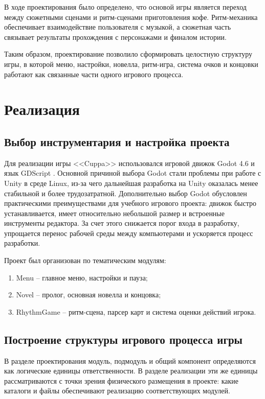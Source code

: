 \documentclass[utf8, russian]{eskdtext}
\numberwithin{equation}{section}
\let\stdsection\section
\renewcommand \section{\newpage\stdsection}
\begin{document}
В ходе проектирования было определено, что основой игры является переход между сюжетными сценами и ритм-сценами приготовления кофе. Ритм-механика обеспечивает взаимодействие пользователя с музыкой, а сюжетная часть связывает результаты прохождения с персонажами и финалом истории.

Таким образом, проектирование позволило сформировать целостную структуру игры, в которой меню, настройки, новелла, ритм-игра, система очков и концовки работают как связанные части одного игрового процесса.

\section{Реализация}

\subsection{Выбор инструментария и настройка проекта}

Для реализации игры <<Cuppa>> использовался игровой движок Godot 4.6 и язык GDScript \cite{godotdocs}. Основной причиной выбора Godot стали проблемы при работе с Unity в среде Linux, из-за чего дальнейшая разработка на Unity оказалась менее стабильной и более трудозатратной. Дополнительно выбор Godot обусловлен практическими преимуществами для учебного игрового проекта: движок быстро устанавливается, имеет относительно небольшой размер и встроенные инструменты редактора. За счет этого снижается порог входа в разработку, упрощается перенос рабочей среды между компьютерами и ускоряется процесс разработки.

Проект был организован по тематическим модулям:
\begin{enumerate}
    \item Menu -- главное меню, настройки и пауза;
    \item Novel -- пролог, основная новелла и концовка;
    \item RhythmGame -- ритм-сцена, парсер карт и система оценки действий игрока.
\end{enumerate}

\subsection{Построение структуры игрового процесса игры}

В разделе проектирования модуль, подмодуль и общий компонент определяются как логические единицы ответственности. В разделе реализации эти же единицы рассматриваются с точки зрения физического размещения в проекте: какие каталоги и файлы обеспечивают реализацию соответствующих модулей.
\end{document}
